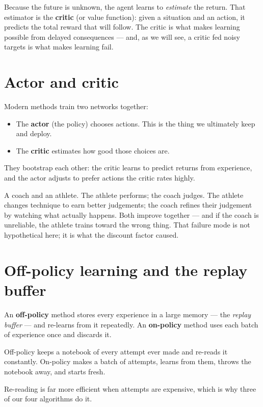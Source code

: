 Because the future is unknown, the agent learns to \emph{estimate} the return.
That estimator is the \textbf{critic} (or value function): given a situation and
an action, it predicts the total reward that will follow. The critic is what
makes learning possible from delayed consequences --- and, as we will see, a
critic fed noisy targets is what makes learning fail.

\section{Actor and critic}

Modern methods train two networks together:

\begin{itemize}[leftmargin=1.4em, itemsep=3pt]
\item The \textbf{actor} (the policy) chooses actions. This is the thing we
ultimately keep and deploy.
\item The \textbf{critic} estimates how good those choices are.
\end{itemize}

They bootstrap each other: the critic learns to predict returns from experience,
and the actor adjusts to prefer actions the critic rates highly.

\begin{plain}
A coach and an athlete. The athlete performs; the coach judges. The athlete
changes technique to earn better judgements; the coach refines their judgement by
watching what actually happens. Both improve together --- and if the coach is
unreliable, the athlete trains toward the wrong thing. That failure mode is not
hypothetical here; it is what the discount factor caused.
\end{plain}

\section{Off-policy learning and the replay buffer}

An \textbf{off-policy} method stores every experience in a large memory --- the
\emph{replay buffer} --- and re-learns from it repeatedly. An \textbf{on-policy}
method uses each batch of experience once and discards it.

\begin{plain}
Off-policy keeps a notebook of every attempt ever made and re-reads it
constantly. On-policy makes a batch of attempts, learns from them, throws the
notebook away, and starts fresh.

Re-reading is far more efficient when attempts are expensive, which is why three
of our four algorithms do it.
\end{plain}


